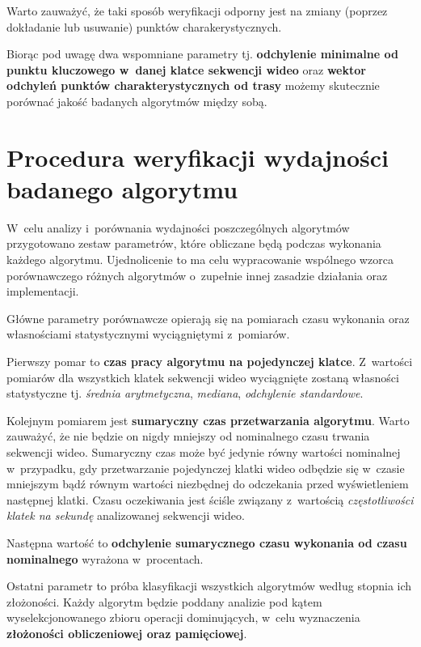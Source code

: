    Warto zauważyć, że taki sposób weryfikacji odporny jest na zmiany (poprzez dokładanie lub usuwanie) punktów charakerystycznych.

    Biorąc pod uwagę dwa wspomniane parametry tj. \textbf{odchylenie minimalne od punktu kluczowego w~danej klatce sekwencji wideo} oraz \textbf{wektor odchyleń punktów charakterystycznych od trasy} możemy skutecznie porównać jakość badanych algorytmów między sobą.

  \section{Procedura weryfikacji wydajności badanego algorytmu}\label{Section_Wydajnosc}

    W~celu analizy i~porównania wydajności poszczególnych algorytmów przygotowano zestaw parametrów, które obliczane będą podczas wykonania każdego algorytmu. Ujednolicenie to ma celu wypracowanie wspólnego wzorca porównawczego różnych algorytmów o~zupełnie innej zasadzie działania oraz implementacji.

    Główne parametry porównawcze opierają się na pomiarach czasu wykonania oraz własnościami statystycznymi wyciągniętymi z~pomiarów.

    Pierwszy pomar to \textbf{czas pracy algorytmu na pojedynczej klatce}. Z~wartości pomiarów dla wszystkich klatek sekwencji wideo wyciągnięte zostaną własności statystyczne tj. \textit{średnia arytmetyczna}, \textit{mediana}, \textit{odchylenie standardowe}.

    Kolejnym pomiarem jest \textbf{sumaryczny czas przetwarzania algorytmu}. Warto zauważyć, że nie będzie on nigdy mniejszy od nominalnego czasu trwania sekwencji wideo. Sumaryczny czas może być jedynie równy wartości nominalnej w~przypadku, gdy przetwarzanie pojedynczej klatki wideo odbędzie się w~czasie mniejszym bądź równym wartości niezbędnej do odczekania przed wyświetleniem następnej klatki. Czasu oczekiwania jest ściśle związany z~wartością \textit{częstotliwości klatek na sekundę} analizowanej sekwencji wideo.

    Następna wartość to \textbf{odchylenie sumarycznego czasu wykonania od czasu nominalnego} wyrażona w~procentach.

    Ostatni parametr to próba klasyfikacji wszystkich algorytmów według stopnia ich złożoności. Każdy algorytm będzie poddany analizie pod kątem wyselekcjonowanego zbioru operacji dominujących, w~celu wyznaczenia \textbf{złożoności obliczeniowej oraz pamięciowej}.
